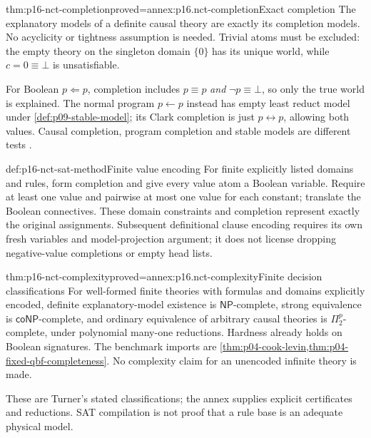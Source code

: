 \begin{hbtheorem}{thm:p16-nct-completion}{proved=annex:p16.nct-completion}{Exact completion}
The explanatory models of a definite causal theory are exactly its
completion models. No acyclicity or tightness assumption is needed.
Trivial atoms must be excluded: the empty theory on the singleton domain
\(\{0\}\) has its unique world, while \(c=0\equiv\bot\) is unsatisfiable.
\end{hbtheorem}

For Boolean \(p\Leftarrow p\), completion includes \(p\equiv p\)
\emph{and} \(\neg p\equiv\bot\), so only the true world is explained.
The normal program \(p\leftarrow p\) instead has empty least reduct model
under \cref{def:p09-stable-model}; its Clark completion is just
\(p\leftrightarrow p\), allowing both values. Causal completion, program
completion and stable models are different tests
\cite[pp.~766--768]{Turner2008NonmonotonicCausalLogic}.

\begin{hbmethod}{def:p16-nct-sat-method}{Finite value encoding}
For finite explicitly listed domains and rules, form completion and give
every value atom a Boolean variable. Require at least one value and pairwise
at most one value for each constant; translate the Boolean connectives.
These domain constraints and completion represent exactly the original
assignments. Subsequent definitional clause encoding requires its own fresh
variables and model-projection argument; it does not license dropping
negative-value completions or empty head lists.
\end{hbmethod}

\begin{hbtheorem}{thm:p16-nct-complexity}{proved=annex:p16.nct-complexity}{Finite decision classifications}
For well-formed finite theories with formulas and domains explicitly encoded,
definite explanatory-model existence is \(\mathsf{NP}\)-complete,
strong equivalence is \(\mathsf{coNP}\)-complete, and ordinary equivalence
of arbitrary causal theories is \(\Pi_2^p\)-complete, under polynomial
many-one reductions. Hardness already holds on Boolean signatures.
The benchmark imports are
\cref{thm:p04-cook-levin,thm:p04-fixed-qbf-completeness}.
No complexity claim for an unencoded infinite theory is made.
\end{hbtheorem}

These are Turner's stated classifications; the annex supplies explicit
certificates and reductions. SAT compilation is not proof that a rule base
is an adequate physical model.

